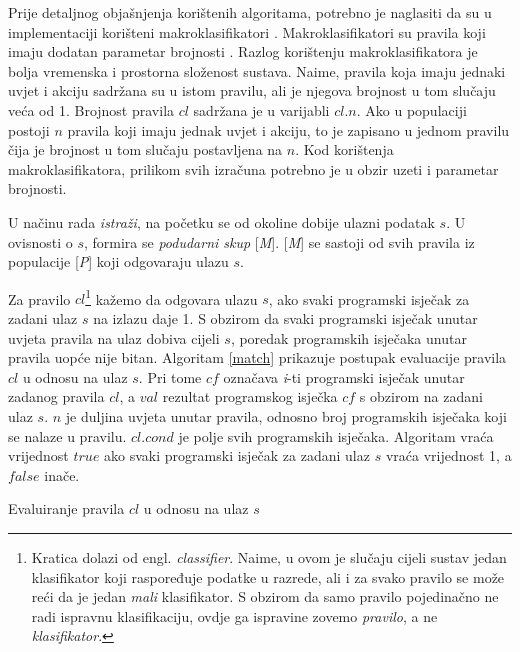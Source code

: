 \documentclass[times, utf8, zavrsni]{fer}
\begin{document}
Prije detaljnog objašnjenja korištenih algoritama, potrebno je naglasiti da su u implementaciji korišteni makroklasifikatori  \citep{2}.
Makroklasifikatori su pravila koji imaju dodatan parametar brojnosti .
Razlog korištenju makroklasifikatora je bolja vremenska i prostorna složenost sustava.
Naime, pravila koja imaju jednaki uvjet i akciju sadržana su u istom pravilu, ali je njegova brojnost u tom slučaju veća od 1.
Brojnost pravila $cl$ sadržana je u varijabli $cl.n$.
Ako u populaciji postoji $n$ pravila koji imaju jednak uvjet i akciju, to je zapisano u jednom pravilu čija je brojnost u tom slučaju postavljena na $n$.
Kod korištenja makroklasifikatora, prilikom svih izračuna potrebno je u obzir uzeti i parametar brojnosti.

U načinu rada \emph{istraži}, na početku se od okoline dobije ulazni podatak $s$.
U ovisnosti o $s$, formira se \emph{podudarni skup} [\emph{M}].
[\emph{M}] se sastoji od svih pravila iz populacije [\emph{P}] koji odgovaraju ulazu $s$.

Za pravilo $cl$\footnote{Kratica dolazi od engl. \emph{classifier}. Naime, u ovom je slučaju cijeli sustav jedan klasifikator koji raspoređuje podatke u razrede, ali i za svako pravilo se može reći da je jedan \emph{mali} klasifikator. S obzirom da samo pravilo pojedinačno ne radi ispravnu klasifikaciju, ovdje ga ispravine zovemo \emph{pravilo}, a ne \emph{klasifikator}.} kažemo da odgovara ulazu $s$, ako svaki programski isječak za zadani ulaz $s$ na izlazu daje 1.
S obzirom da svaki programski isječak unutar uvjeta pravila na ulaz dobiva cijeli $s$, poredak programskih isječaka unutar pravila uopće nije bitan.
Algoritam \ref{match} prikazuje postupak evaluacije pravila $cl$ u odnosu na ulaz $s$.
Pri tome $cf$ označava \emph{i}-ti programski isječak unutar zadanog pravila $cl$, a $val$ rezultat programskog isječka $cf$ s obzirom na zadani ulaz $s$.
$n$ je duljina uvjeta unutar pravila, odnosno broj programskih isječaka koji se nalaze u pravilu.
$cl.cond$ je polje svih programskih isječaka.
Algoritam vraća vrijednost $true$ ako svaki programski isječak za zadani ulaz $s$ vraća vrijednost 1, a $false$ inače.

\begin{algorithm}
    \caption{Evaluiranje pravila $cl$ u odnosu na ulaz $s$}
    \label{match}
    \begin{algorithmic}
        \ENDIF
        \ENDFOR
    \end{algorithmic}
\end{algorithm}
\end{document}
